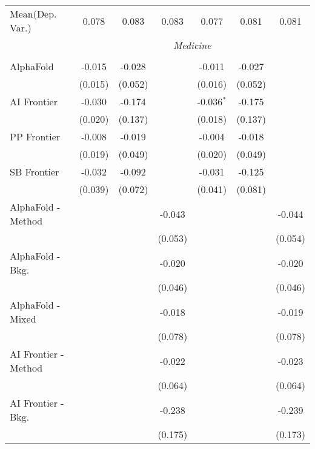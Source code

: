 \begin{tabular}{lcccccc}
Mean(Dep. Var.) & 0.078 & 0.083 & 0.083 & 0.077 & 0.081 & 0.081 \\
 & \multicolumn{6}{c}{\textit{Medicine}} \\ \\
   AlphaFold            & -0.015  & -0.028  &              & -0.011       & -0.027  &   \\   
                        & (0.015) & (0.052) &              & (0.016)      & (0.052) &   \\   
   AI Frontier          & -0.030  & -0.174  &              & -0.036$^{*}$ & -0.175  &   \\   
                        & (0.020) & (0.137) &              & (0.018)      & (0.137) &   \\   
   PP Frontier          & -0.008  & -0.019  &              & -0.004       & -0.018  &   \\   
                        & (0.019) & (0.049) &              & (0.020)      & (0.049) &   \\   
   SB Frontier          & -0.032  & -0.092  &              & -0.031       & -0.125  &   \\   
                        & (0.039) & (0.072) &              & (0.041)      & (0.081) &   \\   
   AlphaFold - Method   &         &         & -0.043       &              &         & -0.044\\   
                        &         &         & (0.053)      &              &         & (0.054)\\   
   AlphaFold - Bkg.     &         &         & -0.020       &              &         & -0.020\\   
                        &         &         & (0.046)      &              &         & (0.046)\\   
   AlphaFold - Mixed    &         &         & -0.018       &              &         & -0.019\\   
                        &         &         & (0.078)      &              &         & (0.078)\\   
   AI Frontier - Method &         &         & -0.022       &              &         & -0.023\\   
                        &         &         & (0.064)      &              &         & (0.064)\\   
   AI Frontier - Bkg.   &         &         & -0.238       &              &         & -0.239\\   
                        &         &         & (0.175)      &              &         & (0.173)\\   

\end{tabular}
